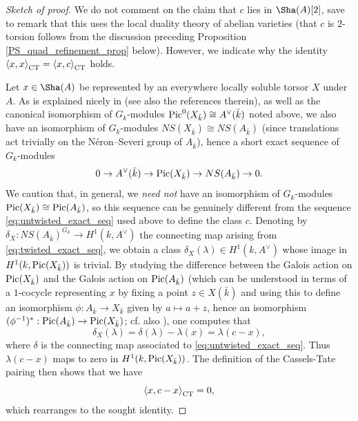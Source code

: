 \documentclass[10pt]{amsart}
\numberwithin{equation}{section}
\theoremstyle{remark}
\theoremstyle{definition}
\theoremstyle{definition}
\theoremstyle{definition}
\theoremstyle{definition}
\theoremstyle{definition}
\theoremstyle{definition}
\theoremstyle{definition}
\theoremstyle{definition}
\begin{document}
\begin{proof}[Sketch of proof]
We do not comment on the claim that $c$ lies in $\Sha(A)[2]$, save to remark that this uses the local duality theory of abelian varieties (that $c$ is $2$-torsion follows from the discussion preceding Proposition \ref{PS_quad_refinement_prop} below). However, we indicate why the identity $\left \langle x,x\right \rangle_{\textup{CT}}=\left \langle x,c\right \rangle_{\textup{CT}}$ holds. 

Let $x\in \Sha(A)$ be represented by an everywhere locally soluble torsor $X$ under $A$. As is explained nicely in \cite[Section 2.4]{Lag25} (see also the references therein), as well as the canonical isomorphism of $G_k$-modules $\textup{Pic}^0(X_{\bar{k}})\cong A^\vee(\bar{k})$ noted above, we also have an isomorphism of $G_k$-modules $NS(X_{\bar{k}})\cong NS(A_{\bar{k}})$ (since translations act trivially on the N\'{e}ron--Severi group of $A_{\bar{k}}$), hence a short exact sequence of $G_k$-modules
\begin{equation} \label{eq:twisted_exact_seq}
0\to A^\vee(\bar{k})\to \textup{Pic}(X_{\bar{k}})\to NS(A_{\bar{k}})\to 0.
\end{equation}
We caution that, in general, we \textit{need not} have an isomorphism of $G_k$-modules $\textup{Pic}(X_{\bar{k}})\cong \textup{Pic}(A_{\bar{k}})$, so this sequence can be genuinely different from the sequence \eqref{eq:untwisted_exact_seq} used above to define the class $c$. Denoting by $\delta_X:NS(A_{\bar{k}})^{G_k}\to H^1(k,A^\vee)$ the connecting map arising from \eqref{eq:twisted_exact_seq}, we obtain a class $\delta_X(\lambda)\in H^1(k,A^\vee)$ whose image in $H^1(k,\textup{Pic}(X_{\bar{k}}))$ is trivial. By studying the difference between the Galois action on $\textup{Pic}(X_{\bar{k}})$  and the Galois action on $\textup{Pic}(A_{\bar{k}})$  (which can be understood in terms of a $1$-cocycle representing $x$  by fixing a point $z\in X(\bar{k})$ and using this to   define an isomorphism $\phi:A_{\bar{k}}\to X_{\bar{k}}$ given by $a\mapsto a+z$,  hence  an isomorphism  $(\phi^{-1})^*:\textup{Pic}(A_{\bar{k}})\to\textup{Pic}(X_{\bar{k}})$; cf. also  \cite[Theorem 3.0.3(i)]{Ale02}), one computes that \[\delta_X(\lambda)=\delta(\lambda)-\lambda(x)=\lambda(c-x),\] where $\delta$ is the connecting map associated to  \eqref{eq:untwisted_exact_seq}. Thus $\lambda(c-x)$ maps to zero in $H^1(k,\textup{Pic}(X_{\bar{k}}))$. The definition of the Cassels-Tate pairing then shows that we have 
\[\left \langle x, c-x\right \rangle_{\textup{CT}}=0,\]
which rearranges to the sought identity.
\end{proof}
\end{document}
